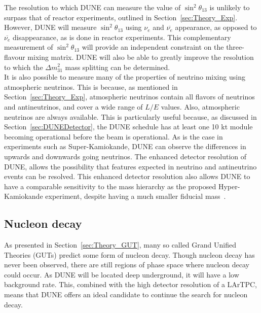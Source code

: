 The resolution to which DUNE can measure the value of $\sin^{2}\theta_{13}$ is unlikely to surpass that of reactor experiments, outlined in Section~\ref{sec:Theory_Exp}. However, DUNE will measure $\sin^{2}\theta_{13}$ using $\nu_e$ and $\overline{\nu_e}$ appearance, as opposed to $\overline{\nu_e}$ disappearance, as is done in reactor experiments. This complementary measurement of $\sin^{2}\theta_{13}$ will provide an independent constraint on the three-flavour mixing matrix. DUNE will also be able to greatly improve the resolution to which the $\Delta m^{2}_{31}$ mass splitting can be determined. \\

It is also possible to measure many of the properties of neutrino mixing using atmospheric neutrinos. This is because, as mentioned in Section~\ref{sec:Theory_Exp}, atmospheric neutrinos contain all flavors of neutrinos and antineutrinos, and cover a wide range of $L/E$ values. Also, atmospheric neutrinos are always available. This is particularly useful because, as discussed in Section~\ref{sec:DUNEDetector}, the DUNE schedule has at least one 10 kt module becoming operational before the beam is operational. As is the case in experiments such as Super-Kamiokande, DUNE can observe the differences in upwards and downwards going neutrinos. The enhanced detector resolution of DUNE, allows the possibility that features expected in neutrino and antineutrino events can be resolved. This enhanced detector resolution also allows DUNE to have a comparable sensitivity to the mass hierarchy as the proposed Hyper-Kamiokande experiment, despite having a much smaller fiducial mass~\citep{DUNECDR_V2}.  

\subsection{Nucleon decay} \label{sec:DUNE_NDK}%
As presented in Section~\ref{sec:Theory_GUT}, many so called Grand Unified Theories (GUTs) predict some form of nucleon decay. Though nucleon decay has never been observed, there are still regions of phase space where nucleon decay could occur. As DUNE will be located deep underground, it will have a low background rate. This, combined with the high detector resolution of a LArTPC, means that DUNE offers an ideal candidate to continue the search for nucleon decay. \\

